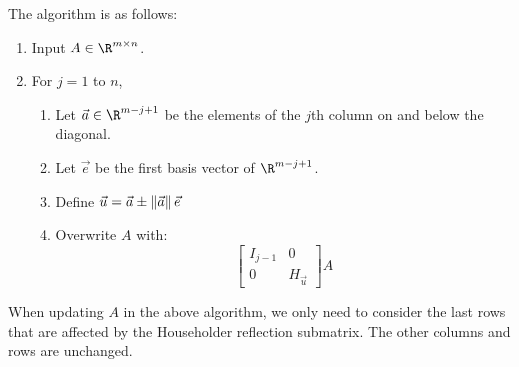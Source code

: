 \documentclass[../Main.tex]{subfiles}
\begin{document}
The algorithm is as follows:
\begin{enumerate}
    \item Input $A \in \R^{m \times n}$.
    \item For $j = 1$ to $n$,
    \begin{enumerate}
        \item Let $\vec{a} \in \R^{m - j + 1}$ be the elements of the $j$th column on and below the diagonal.
        \item Let $\vec{e}$ be the first basis vector of $\R^{m - j + 1}$.
        \item Define $\vec{u} = \vec{a} \pm \left\|\vec{a}\right\|\vec{e}$
        \item Overwrite $A$ with:
            \begin{equation*}
                \begin{bmatrix}
                    I_{j - 1} & 0 \\
                    0 & H_{\vec{u}}
                \end{bmatrix}
                A
            \end{equation*}
    \end{enumerate}
\end{enumerate}
\begin{remarks}
    \item When updating $A$ in the above algorithm, we only need to consider the last rows that are affected by the Householder reflection submatrix. The other columns and rows are unchanged.
\end{remarks}
\end{document}
